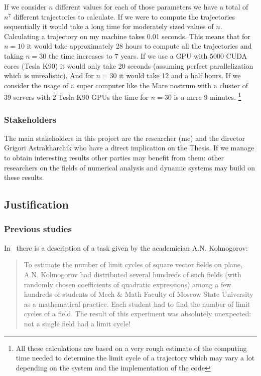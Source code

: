 If we consider $n$ different values for each of those parameters we have a total
of $n^7$ different trajectories to calculate. If we were to compute the
trajectories sequentially it would take a long time for moderately sized values
of $n$. Calculating a trajectory on my machine takes 0.01 seconds. This means
that for $n=10$ it would take approximately 28 hours to compute all the
trajectories and taking $n=30$ the time increases to 7 years. If we use a GPU
with 5000 CUDA cores (Tesla K90) it would only take 20 seconds (assuming perfect
parallelization which is unrealistic). And for $n=30$ it would take 12 and a
half hours. If we consider the usage of a super computer like the Mare nostrum
with a cluster of 39 servers with 2 Tesla K90 GPUs the time for $n=30$ is a mere
9 minutes. \footnote{All these calculations are based on a very rough estimate
of the computing time needed to determine the limit cycle of a trajectory which
may vary a lot depending on the system and the implementation of the code}

\subsubsection{Stakeholders}

The main stakeholders in this project are the researcher (me) and the director
Grigori Astrakharchik who have a direct implication on the Thesis. If we manage
to obtain interesting results other parties may benefit from them: other
researchers on the fields of numerical analysis and dynamic systems may build on
these results.



\pagebreak
\subsection{Justification}
\subsubsection{Previous studies}


In~\cite{kuznetsov_visualization_2013} there is a description of a task given by
the academician A.N. Kolmogorov:

\begin{quote}
To estimate the number of limit cycles of square vector fields on plane, A.N. Kolmogorov had
distributed several hundreds of such fields (with randomly chosen coefficients
of quadratic expressions) among a few hundreds of students of Mech \& Math
Faculty of Moscow State University as a mathematical practice. Each student had
to find the number of limit cycles of a field. The result of this experiment was
absolutely unexpected: not a single field had a limit cycle!
\end{quote}

